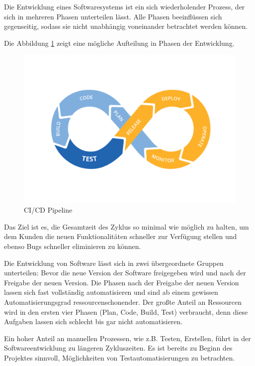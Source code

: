 Die Entwicklung eines Softwaresystems ist ein sich wiederholender Prozess, der sich in mehreren Phasen unterteilen lässt.
Alle Phasen beeinflüssen sich gegenseitig, sodass sie nicht unabhängig voneinander betrachtet werden können.

Die Abbildung \ref{fig:workflowCiCd} zeigt eine mögliche Aufteilung in Phasen der Entwicklung. 
\begin{figure}[H]
    \centering
    \includegraphics[width=1\textwidth]{../images/CiCD.png}
    \caption[CI/CD Pipeline]{CI/CD Pipeline \footnotemark}
    \label{fig:workflowCiCd}
\end{figure}

Das Ziel ist es, die Gesamtzeit des Zyklus so minimal wie möglich zu halten, um dem Kunden die neuen Funktionalitäten schneller zur Verfügung stellen und ebenso
Bugs schneller eliminieren zu können.



Die Entwicklung von Software lässt sich in zwei übergeordnete Gruppen unterteilen:
Bevor die neue Version der Software freigegeben 
wird und nach der Freigabe der neuen Version.
Die Phasen nach der Freigabe der neuen Version lassen sich fast vollständig automatisieren 
und sind ab einem gewissen Automatisierungsgrad ressourcenschonender.
Der großte Anteil an Ressourcen wird in den ersten vier Phasen (Plan, Code, Build, Test) verbraucht, 
denn diese Aufgaben lassen sich schlecht bis gar nicht automatisieren. 

Ein hoher Anteil an manuellen Prozessen, wie z.B. Testen, Erstellen, führt in der Softwareentwicklung 
zu längeren Zykluszeiten. Es ist bereits zu Beginn des Projektes sinnvoll, Möglichkeiten von Testautomatisierungen zu betrachten.

